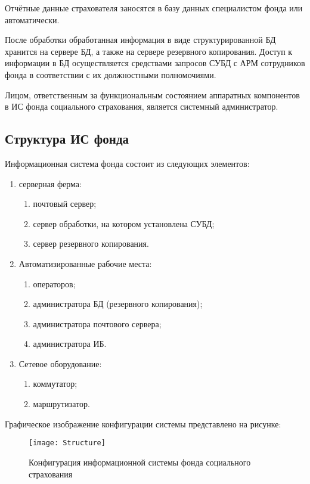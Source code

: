 \point Отчётные данные страхователя заносятся в базу данных
специалистом фонда или автоматически.

\point После обработки обработанная информация в виде
структурированной БД хранится на сервере БД, а также на сервере
резервного копирования. Доступ к информации в БД осуществляется
средствами запросов СУБД с АРМ сотрудников фонда в соответствии с их
должностными полномочиями.

\point Лицом, ответственным за функциональным состоянием аппаратных
компонентов в ИС фонда социального страхования, является системный
администратор.

\subsection{Структура ИС фонда}

\point Информационная система фонда состоит из следующих элементов:

\begin{enumerate}
\item серверная ферма:
  \begin{enumerate}
  \item почтовый сервер;
  \item сервер обработки, на котором установлена СУБД;
  \item сервер резервного копирования.
  \end{enumerate}
\item Автоматизированные рабочие места:
  \begin{enumerate}
  \item операторов;
  \item администратора БД (резервного копирования);
  \item администратора почтового сервера;
  \item администратора ИБ.
  \end{enumerate}
\item Сетевое оборудование:
  \begin{enumerate}
  \item коммутатор;
  \item маршрутизатор.
  \end{enumerate}
\end{enumerate}

\point Графическое изображение конфигурации системы представлено на рисунке:

\begin{figure}[h]
  \centering
  \texttt{[image: Structure]}
  \caption{Конфигурация информационной системы фонда социального страхования}
  \label{fig:structure}  
\end{figure}

